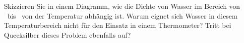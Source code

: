 Skizzieren Sie in einem Diagramm, wie die Dichte von Wasser im Bereich von \tdNO\ bis \tdZO\ von der Temperatur abhängig ist. Warum eignet sich Wasser in diesem Temperaturbereich nicht für den Einsatz in einem Thermometer? Tritt bei Quecksilber dieses Problem ebenfalls auf?
